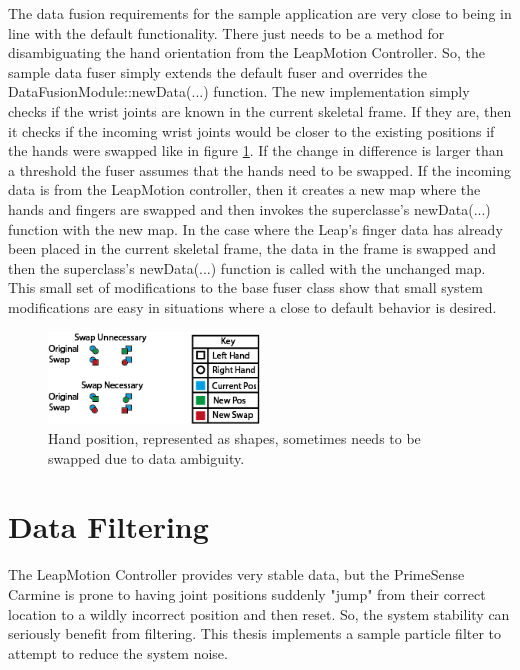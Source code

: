The data fusion requirements for the sample application are very close to being in line with the default functionality. There just needs to be a method for disambiguating the hand orientation from the LeapMotion Controller. So, the sample data fuser simply extends the default fuser and overrides the DataFusionModule::newData(...) function. The new implementation simply checks if the wrist joints are known in the current skeletal frame. If they are, then it checks if the incoming wrist joints would be closer to the existing positions if the hands were swapped like in figure \ref{fig:hand_swap}. If the change in difference is larger than a threshold the fuser assumes that the hands need to be swapped. If the incoming data is from the LeapMotion controller, then it creates a new map where the hands and fingers are swapped and then invokes the superclasse's newData(...) function with the new map. In the case where the Leap's finger data has already been placed in the current skeletal frame, the data in the frame is swapped and then the superclass's newData(...) function is called with the unchanged map. This small set of modifications to the base fuser class show that small system modifications are easy in situations where a close to default behavior is desired.

\begin{figure}[]
\centering
\includegraphics[width=0.5\textwidth]{figures/handSwap}
\caption{Hand position, represented as shapes, sometimes needs to be swapped due to data ambiguity.}
\label{fig:hand_swap}
\end{figure}

\section{Data Filtering}

The LeapMotion Controller provides very stable data, but the PrimeSense Carmine is prone to having joint positions suddenly "jump" from their correct location to a wildly incorrect position and then reset. So, the system stability can seriously benefit from filtering. This thesis implements a sample particle filter to attempt to reduce the system noise.

